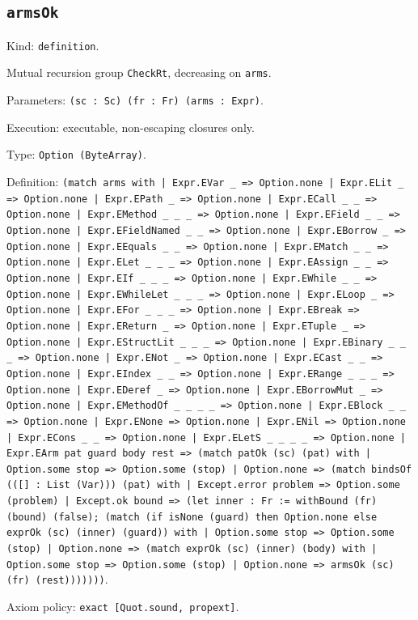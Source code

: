 \documentclass[11pt]{article}
\begin{document}
\subsection*{\texttt{armsOk}}
\noindent Kind: \texttt{definition}.\par
\noindent Mutual recursion group \texttt{CheckRt}, decreasing on \texttt{arms}.\par
\noindent Parameters: \texttt{(sc : Sc) (fr : Fr) (arms : Expr)}.\par
\noindent Execution: executable, non-escaping closures only.\par
\noindent Type: \texttt{Option (ByteArray)}.\par
\noindent Definition: \texttt{(match arms with | Expr.EVar \_ => Option.none | Expr.ELit \_ => Option.none | Expr.EPath \_ => Option.none | Expr.ECall \_ \_ => Option.none | Expr.EMethod \_ \_ \_ => Option.none | Expr.EField \_ \_ => Option.none | Expr.EFieldNamed \_ \_ => Option.none | Expr.EBorrow \_ => Option.none | Expr.EEquals \_ \_ => Option.none | Expr.EMatch \_ \_ => Option.none | Expr.ELet \_ \_ \_ => Option.none | Expr.EAssign \_ \_ => Option.none | Expr.EIf \_ \_ \_ => Option.none | Expr.EWhile \_ \_ => Option.none | Expr.EWhileLet \_ \_ \_ => Option.none | Expr.ELoop \_ => Option.none | Expr.EFor \_ \_ \_ => Option.none | Expr.EBreak => Option.none | Expr.EReturn \_ => Option.none | Expr.ETuple \_ => Option.none | Expr.EStructLit \_ \_ \_ => Option.none | Expr.EBinary \_ \_ \_ => Option.none | Expr.ENot \_ => Option.none | Expr.ECast \_ \_ => Option.none | Expr.EIndex \_ \_ => Option.none | Expr.ERange \_ \_ \_ => Option.none | Expr.EDeref \_ => Option.none | Expr.EBorrowMut \_ => Option.none | Expr.EMethodOf \_ \_ \_ \_ => Option.none | Expr.EBlock \_ \_ => Option.none | Expr.ENone => Option.none | Expr.ENil => Option.none | Expr.ECons \_ \_ => Option.none | Expr.ELetS \_ \_ \_ \_ => Option.none | Expr.EArm pat guard body rest => (match patOk (sc) (pat) with | Option.some stop => Option.some (stop) | Option.none => (match bindsOf (([] : List (Var))) (pat) with | Except.error problem => Option.some (problem) | Except.ok bound => (let inner : Fr := withBound (fr) (bound) (false); (match (if isNone (guard) then Option.none else exprOk (sc) (inner) (guard)) with | Option.some stop => Option.some (stop) | Option.none => (match exprOk (sc) (inner) (body) with | Option.some stop => Option.some (stop) | Option.none => armsOk (sc) (fr) (rest)))))))}.\par
\noindent Axiom policy: \texttt{exact [Quot.sound, propext]}.\par
\end{document}
